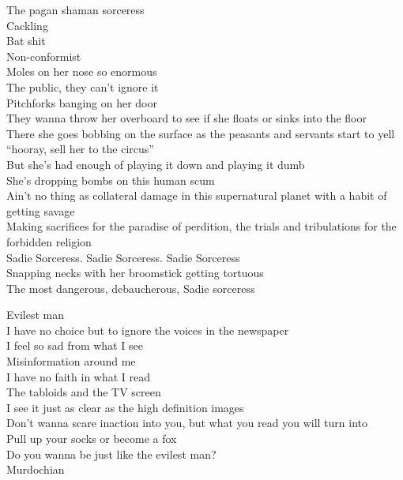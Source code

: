 The pagan shaman sorceress \\
Cackling \\
Bat shit \\
Non-conformist \\
Moles on her nose so enormous \\
The public, they can't ignore it \\
Pitchforks banging on her door \\
They wanna throw her overboard to see if she floats or sinks into the floor \\
There she goes bobbing on the surface as the peasants and servants start to yell ``hooray, sell her to the circus'' \\
But she's had enough of playing it down and playing it dumb \\
She's dropping bombs on this human scum \\
Ain't no thing as collateral damage in this supernatural planet with a habit of getting savage \\
Making sacrifices for the paradise of perdition, the trials and tribulations for the forbidden religion \\

Sadie Sorceress. Sadie Sorceress. Sadie Sorceress \\
Snapping necks with her broomstick getting tortuous \\

The most dangerous, debaucherous, Sadie sorceress \\




Evilest man \\

I have no choice but to ignore the voices in the newspaper \\
I feel so sad from what I see \\
Misinformation around me \\

I have no faith in what I read \\
The tabloids and the TV screen \\
I see it just as clear as the high definition images \\

Don't wanna scare inaction into you, but what you read you will turn into \\
Pull up your socks or become a fox \\
Do you wanna be just like the evilest man? \\
Murdochian \\

